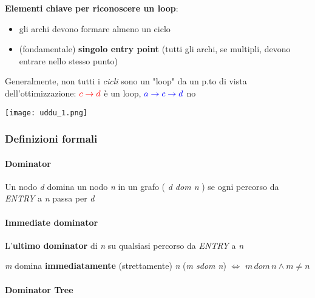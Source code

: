 \noindent\begin{minipage}[c]{.45\textwidth}
\textbf{Elementi chiave per riconoscere un loop}:
\begin{itemize}
  \item gli archi devono formare almeno un ciclo
  \item (fondamentale) \textbf{singolo entry point} (tutti gli archi, se multipli, devono entrare nello stesso punto)
\end{itemize}
\end{minipage}\hfill
\begin{minipage}[c]{.5\textwidth}
\begin{example}[frametitle={}]
  \noindent\begin{minipage}[c]{.7\textwidth}
    Generalmente, non tutti i \textit{cicli} sono un "loop" da un p.to di vista dell'ottimizzazione: $\textcolor{red}{c\rightarrow d}$ \`e un loop, $\textcolor{blue}{a\rightarrow c \rightarrow d}$ no
  \end{minipage}\hfill
  \begin{minipage}[c]{.25\textwidth}
  \texttt{[image: uddu\_1.png]}
  \end{minipage}
\end{example}
\end{minipage}

\subsubsection{Definizioni formali}

\paragraph{Dominator}

Un nodo \textit{d} domina un nodo \textit{n} in un grafo ( \textit{d dom n} ) se ogni percorso da \textit{ENTRY} a \textit{n} passa per \textit{d}
\paragraph{Immediate dominator}

L'\textbf{ultimo dominator} di \textit{n} su qualsiasi percorso da \textit{ENTRY} a \textit{n}

\textit{m} domina \textbf{immediatamente} (strettamente) \textit{n} (\textit{m sdom n}) $\iff$ $m\, dom \,n\land m \neq n$

\paragraph{Dominator Tree}


